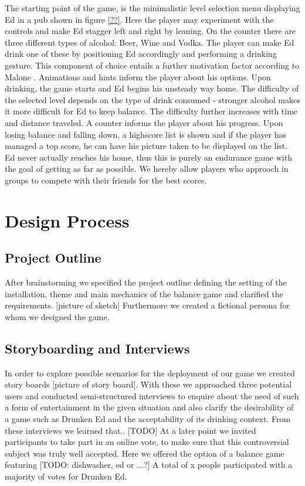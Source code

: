 \documentclass{chi-ext}
\begin{document}
The starting point of the game, is the minimalistic level selection menu displaying Ed in a pub shown in figure \ref{??}. Here the player may experiment with the controls and make Ed stagger left and right by leaning. On the counter there are three different types of alcohol: Beer, Wine and Vodka. The player can make Ed drink one of these by positioning Ed accordingly and performing a drinking gesture. This component of choice entails a further motivation factor according to Malone \cite{malone1981motivation}. Animations and hints inform the player about his options. Upon drinking, the game starts and Ed begins his unsteady way home. The difficulty of the selected level depends on the type of drink consumed - stronger alcohol makes it more difficult for Ed to keep balance. The difficulty further increases with time and distance traveled. A counter informs the player about his progress. Upon losing balance and falling down, a highscore list is shown and if the player has managed a top score, he can have his picture taken to be displayed on the list. Ed never actually reaches his home, thus this is purely an endurance game with the goal of getting as far as possible. We hereby allow players who approach in groups to compete with their friends for the best scores. \cite{ohara2008understanding}

\section{Design Process}
\subsection{Project Outline}
After brainstorming we specified the project outline defining the setting of the installation, theme and main mechanics of the balance game and clarified the requirements. [picture of sketch]
Furthermore we created a fictional persona for whom we designed the game.
\subsection{Storyboarding and Interviews}
In order to explore possible scenarios for the deployment of our game we created story boards [picture of story board]. With these we approached three potential users and conducted semi-structured interviews to enquire about the need of such a form of entertainment in the given situation and also clarify the desirability of a  game such as Drunken Ed and the acceptability of its drinking context. From these interviews we learned that.. [TODO]
At a later point we invited participants to take part in an online vote, to make sure that this controversial subject was truly well accepted. Here we offered the option of a balance game featuring [TODO: dishwasher, ed or ...?] A total of x people participated with a majority of votes for Drunken Ed.
\end{document}
